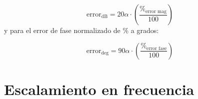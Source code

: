 	\begin{equation}
	\mathrm{error}_{\mathrm{dB}} =  20 \alpha \cdot \left( \frac{\%_{\mathrm{error\,\,mag}}}{100} \right)
	\end{equation}
	y para el error de fase normalizado de \% a grados:
	
	\begin{equation}
	\mathrm{error}_{\mathrm{deg}} = 90 \alpha \cdot \left( \frac{\%_{\mathrm{error\,\,fase}}}{100} \right) 
	\end{equation}
	


	                                                                                                
	\section{Escalamiento en frecuencia}
	
	
	
	
	


